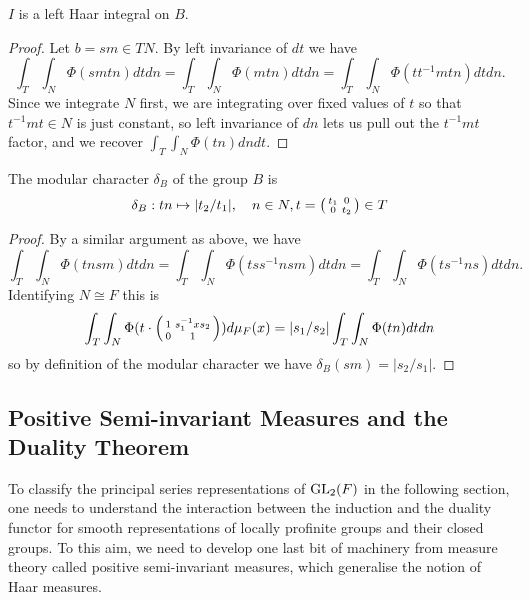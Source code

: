\begin{prop}
    $I$ is a left Haar integral on $B$.
\end{prop}
\begin{proof}
    Let $b=sm \in TN$. By left invariance of $dt$ we have
    $$\int_T\int_N \Phi(smtn)dtdn = \int_T\int_N \Phi(mtn)dtdn = \int_T\int_N \Phi(tt^{-1}mtn)dtdn.$$
    Since we integrate $N$ first, we are integrating over fixed values of $t$ so that $t^{-1}mt \in N$ is just constant, so left invariance of $dn$ lets us pull out the $t^{-1}mt$ factor, and we recover $\int_T\int_N \Phi(tn) dn dt$.
\end{proof}

\begin{prop}\label{prop:modularchar}
    The modular character $\delta_B$ of the group $B$ is
    $$\delta_B : tn \mapsto |t_2/t_1|, \quad n \in N, t = \begin{psmallmatrix}
        t_1 & 0 \\ 0 & t_2
    \end{psmallmatrix} \in T$$
\end{prop}
\begin{proof}
    By a similar argument as above, we have
    $$\int_T\int_N \Phi(tnsm) dtdn = \int_T\int_N \Phi(tss^{-1}nsm)dtdn = \int_T\int_N \Phi(ts^{-1}ns) dt dn.$$ Identifying $N \cong F$ this is
    $$\int_T\int_N \Phi(t \cdot \begin{psmallmatrix}
        1 & s_1^{-1}xs_2 \\0&1 
    \end{psmallmatrix}) d\mu_F(x) = |s_1/s_2|\int_T\int_N\Phi(tn)dtdn$$
    so by definition of the modular character we have $\delta_B(sm) = |s_2/s_1|$.
\end{proof}






\subsection{Positive Semi-invariant Measures and the Duality Theorem}

To classify the principal series representations of $\mathrm{GL}_2(F)$ in the following section, one needs to understand the interaction between the induction and the duality functor for smooth representations of locally profinite groups and their closed groups. To this aim, we need to develop one last bit of machinery from measure theory called positive semi-invariant measures, which generalise the notion of Haar measures.

